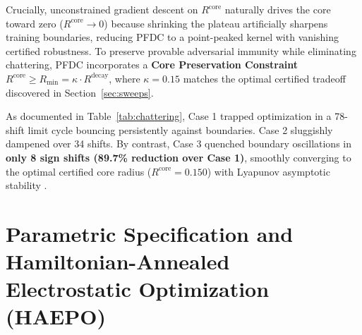 \documentclass[preprint,review,12pt]{elsarticle}
\newcommand{\FloatBarrier}{\clearpage}
\begin{document}
Crucially, unconstrained gradient descent on $R^{\mathrm{core}}$ naturally drives the core toward zero ($R^{\mathrm{core}} \to 0$) because shrinking the plateau artificially sharpens training boundaries, reducing PFDC to a point-peaked kernel with vanishing certified robustness. To preserve provable adversarial immunity while eliminating chattering, PFDC incorporates a \textbf{Core Preservation Constraint} $R^{\mathrm{core}} \ge R_{\min} = \kappa \cdot R^{\mathrm{decay}}$, where $\kappa = 0.15$ matches the optimal certified tradeoff discovered in Section~\ref{sec:sweeps}.

As documented in Table~\ref{tab:chattering}, Case 1 trapped optimization in a 78-shift limit cycle bouncing persistently against boundaries. Case 2 sluggishly dampened over 34 shifts. By contrast, Case 3 quenched boundary oscillations in \textbf{only 8 sign shifts (89.7\% reduction over Case 1)}, smoothly converging to the optimal certified core radius ($R^{\mathrm{core}} = 0.150$) with Lyapunov asymptotic stability \cite{robbins1951stochastic}.

\begin{table}[!htbp]
\centering
\small
\caption{Dynamic Learning Rate Optimization Regimes on Radial Parameters.}
\label{tab:chattering}
\end{table}


\FloatBarrier

\section{Parametric Specification and Hamiltonian-Annealed Electrostatic Optimization (HAEPO)}
\label{sec:haepo}
\end{document}
